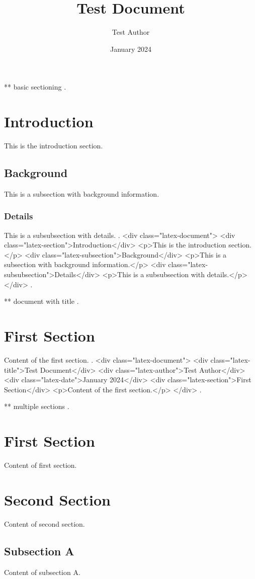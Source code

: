** basic sectioning
.
\section{Introduction}
This is the introduction section.

\subsection{Background}
This is a subsection with background information.

\subsubsection{Details}
This is a subsubsection with details.
.
<div class="latex-document">
<div class="latex-section">Introduction</div>
<p>This is the introduction section.</p>
<div class="latex-subsection">Background</div>
<p>This is a subsection with background information.</p>
<div class="latex-subsubsection">Details</div>
<p>This is a subsubsection with details.</p>
</div>
.


** document with title
.
\title{Test Document}
\author{Test Author}
\date{January 2024}

\maketitle

\section{First Section}
Content of the first section.
.
<div class="latex-document">
<div class="latex-title">Test Document</div>
<div class="latex-author">Test Author</div>
<div class="latex-date">January 2024</div>
<div class="latex-section">First Section</div>
<p>Content of the first section.</p>
</div>
.


** multiple sections
.
\section{First Section}
Content of first section.

\section{Second Section}
Content of second section.

\subsection{Subsection A}
Content of subsection A.

